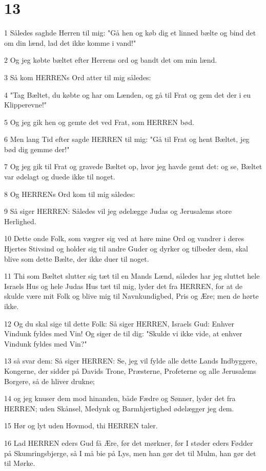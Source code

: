\chapter{13}

\par 1 Således saghde Herren til mig: "Gå hen og køb dig et linned bælte og bind det om din lænd, lad det ikke komme i vand!"
\par 2 Og jeg købte bæltet efter Herrens ord og bandt det om min lænd.
\par 3 Så kom HERRENs Ord atter til mig således:
\par 4 "Tag Bæltet, du købte og har om Lænden, og gå til Frat og gem det der i eu Klipperevne!"
\par 5 Og jeg gik hen og gemte det ved Frat, som HERREN bød.
\par 6 Men lang Tid efter sagde HERREN til mig: "Gå til Frat og hent Bæltet, jeg bød dig gemme der!"
\par 7 Og jeg gik til Frat og gravede Bæltet op, hvor jeg havde gemt det: og se, Bæltet var ødelagt og duede ikke til noget.
\par 8 Og HERRENs Ord kom til mig således:
\par 9 Så siger HERREN: Således vil jeg ødelægge Judas og Jerusalems store Herlighed.
\par 10 Dette onde Folk, som vægrer sig ved at høre mine Ord og vandrer i deres Hjertes Stivsind og holder sig til andre Guder og dyrker og tilbeder dem, skal blive som dette Bælte, der ikke duer til noget.
\par 11 Thi som Bæltet slutter sig tæt til en Mands Lænd, således har jeg sluttet hele Israels Hus og hele Judas Hus tæt til mig, lyder det fra HERREN, for at de skulde være mit Folk og blive mig til Navnkundigbed, Pris og Ære; men de hørte ikke.
\par 12 Og du skal sige til dette Folk: Så siger HERREN, Israels Gud: Enhver Vindunk fyldes med Vin! Og siger de til dig: "Skulde vi ikke vide, at enhver Vindunk fyldes med Vin?"
\par 13 så svar dem: Så siger HERREN: Se, jeg vil fylde alle dette Lands Indbyggere, Kongerne, der sidder på Davids Trone, Præsterne, Profeterne og alle Jerusalems Borgere, så de hliver drukne;
\par 14 og jeg knuser dem mod hinanden, både Fædre og Sønner, lyder det fra HERREN; uden Skånsel, Medynk og Barmhjertighed ødelægger jeg dem.
\par 15 Hør og lyt uden Hovmod, thi HERREN taler.
\par 16 Lad HERREN eders Gud få Ære, før det mørkner, før I støder eders Fødder på Skumringsbjerge, så I må bie på Lys, men han gør det til Mulm, han gør det til Mørke.
